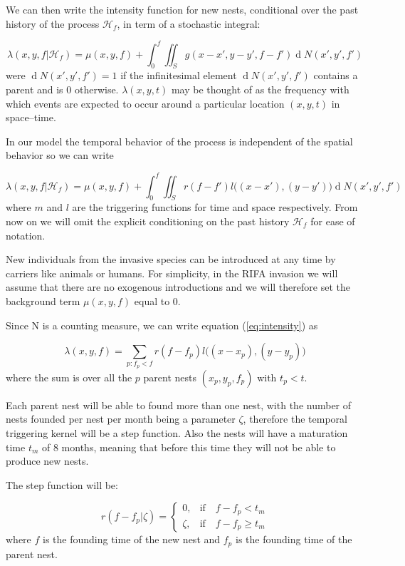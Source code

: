 \documentclass[11pt,a4paper]{article}
\renewcommand{\d}[1]{\ensuremath{\operatorname{d}\!{#1}}}
\begin{document}
We can then write the intensity function for new nests, conditional over the past history of the process $\mathcal{H}_f$, in term of a stochastic integral:

\begin{equation}\label{eq:intensity}
    \lambda(x, y, f | \mathcal{H}_f) = \mu(x, y, f) + \int_{0}^{f} \iint_{S} g(x - x', y - y', f - f') \d N(x', y', f')
\end{equation}
were $\d N(x', y', f') = 1$ if the infinitesimal element $\d N(x', y', f')$ contains a parent and is 0 otherwise. $\lambda(x, y, t)$ may be thought of as the frequency with which events are expected to occur around a particular location $(x, y, t)$ in space–time.

In our model the temporal behavior of the process is independent of the spatial behavior so we can write

\begin{equation*}
    \lambda(x, y, f | \mathcal{H}_f) = \mu(x, y, f) + \int_{0}^{f} \iint_{S} r(f-f') l\Big((x - x'), (y - y')\Big) \d N(x', y', f')
\end{equation*}
where $m$ and $l$ are the triggering functions for time and space respectively. From now on we will omit the explicit conditioning on the past history $\mathcal{H}_f$ for ease of notation.

New individuals from the invasive species can be introduced at any time by carriers like animals or humans. For simplicity, in the RIFA invasion we will assume that there are no exogenous introductions and we will therefore set the background term $\mu(x, y, f) $ equal to 0.

Since N is a counting measure, we can write equation (\ref{eq:intensity}) as

\begin{equation*}
    \lambda(x, y, f) = \sum_{ p: f_p < f } r(f - f_p) l \Big((x - x_p),(y - y_p) \Big)
\end{equation*}
where the sum is over all the $p$ parent nests $(x_p, y_p, f_p)$ with $t_p < t$.

Each parent nest will be able to found more than one nest, with the number of nests founded per nest per month being a parameter $\zeta$, therefore the temporal triggering kernel will be a step function. Also the nests will have a maturation time $t_m$ of 8 months, meaning that before this time they will not be able to produce new nests. 

The step function will be:

\begin{equation*}
    r (f - f_p | \zeta) =
    \begin{cases}
        0, & \mbox{if} \quad f - f_p < t_{m} \\
        \zeta, & \mbox{if} \quad f - f_p \geq t_{m}
    \end{cases}
\end{equation*}
where $f$ is the founding time of the new nest and $f_p$ is the founding time of the parent nest.
\end{document}
